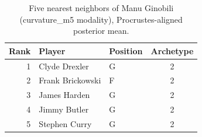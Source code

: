 \begin{table}[htbp]
  \centering\small
  \begin{tabular}{rllc}
    \toprule
    Rank & Player & Position & Archetype \\
    \midrule
    1 & Clyde Drexler & G & 2 \\
    2 & Frank Brickowski & F & 2 \\
    3 & James Harden & G & 2 \\
    4 & Jimmy Butler & G & 2 \\
    5 & Stephen Curry & G & 2 \\
    \bottomrule
  \end{tabular}
  \caption{Five nearest neighbors of Manu Ginobili (curvature_m5 modality), Procrustes-aligned posterior mean.}
  \label{tab:Manu_Ginobili_neighbors_curvature_m5}
\end{table}

